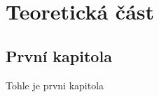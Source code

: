 \part{Teoretická část}

\hypertarget{prvnuxed-kapitola}{%
\chapter{První kapitola}\label{prvnuxed-kapitola}}

Tohle je prvni kapitola
